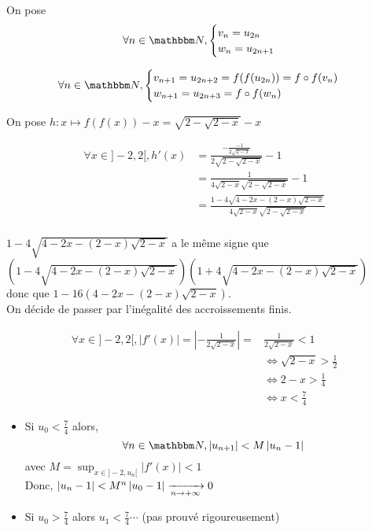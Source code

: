 \begin{enumerate}
		On pose \[
			\forall n \in \N, \begin{cases}
				v_n = u_{2n}\\
				w_n = u_{2n+1}
			\end{cases}	
		\]

		\[
			\forall n \in \N,
			\begin{cases}
				v_{n+1} = u_{2n+2} = f(f(u_{2n})) = f \circ f (v_n)\\
				w_{n+1} = u_{2n+3} = f\circ f (w_n)
			\end{cases}
		\] 

		\begin{center}
		\end{center}

		On pose $h: x \mapsto f(f(x)) - x = \sqrt{2 - \sqrt{2 - x}} - x$

		\begin{align*}
			\forall x \in ]-2,2[, h'(x) &= \frac{-\frac{-1}{2\sqrt{2-x}}}{2\sqrt{2 - \sqrt{2-x} } } - 1 \\
			&= \frac{1}{4\sqrt{2-x} \sqrt{2-\sqrt{2-x} } } -1 \\
			&= \frac{1-4\sqrt{4-2x - (2-x)\sqrt{2-x}}}{4\sqrt{2-x}\sqrt{2-\sqrt{2-x}}} \\
		\end{align*}

		$1 - 4\sqrt{4 - 2x - (2 -x)\sqrt{2-x}}$ a le même signe que \\$\left( 1 - 4\sqrt{4 - 2x - (2-x)\sqrt{2-x}} \right) \left( 1 + 4\sqrt{4 - 2x - (2-x)\sqrt{2-x}} \right)$ \\
		donc que $1 - 16\left( 4 - 2x - (2-x)\sqrt{2-x}  \right)$.\\

		On décide de passer par l'inégalité des accroissements finis.

		\begin{align*}
			\forall x \in ]-2,2[,
			\left| f'(x) \right| = \left| -\frac{1}{2\sqrt{2-x}} \right| = &\frac{1}{2\sqrt{2-x}} < 1\\
			&\iff \sqrt{2-x}> \frac{1}{2}\\
			&\iff 2-x > \frac{1}{4}\\
			&\iff x < \frac{7}{4}
		\end{align*}
		
		\begin{itemize}
			\item 
				Si $u_0 < \frac{7}{4}$ alors, \[
					\forall n \in \N, \left| u_{n+1} \right|  < M \left| u_n - 1 \right| 
				\] avec $M = \sup_{x \in ]-2, u_n[}\left| f'(x) \right| < 1$ \\
				Donc, $\left| u_n - 1 \right| < M^n \left| u_0 - 1 \right| \xrightarrow[n \to +\infty]{} 0$
			\item Si $u_0 > \frac{7}{4}$ alors $u_1< \frac{7}{4}\cdots$ (pas prouvé rigoureusement)
		\end{itemize}
\end{enumerate}
